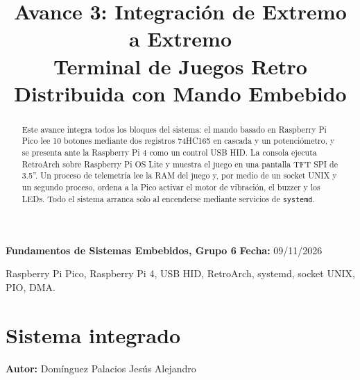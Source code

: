 \documentclass[conference]{IEEEtran}
\begin{document}
\title{Avance 3: Integración de Extremo a Extremo \\
	\large Terminal de Juegos Retro Distribuida con Mando Embebido}

\author{
	\and
	\and
	\and
	\and
	\and
}

\maketitle

\begin{center}
	\vspace{-0.3cm}
	{\small \textbf{Fundamentos de Sistemas Embebidos, Grupo 6} \quad
		\textbf{Fecha:} 09/11/2026}
\end{center}

\begin{abstract}
Este avance integra todos los bloques del sistema: el mando basado en Raspberry Pi Pico lee 10 botones
mediante dos registros 74HC165 en cascada y un potenciómetro, y se presenta ante la Raspberry Pi 4 como un
control USB HID. La consola ejecuta RetroArch sobre Raspberry Pi OS Lite y muestra el juego en una pantalla
TFT SPI de 3.5''. Un proceso de telemetría lee la RAM del juego y, por medio de un socket UNIX y un segundo
proceso, ordena a la Pico activar el motor de vibración, el buzzer y los LEDs. Todo el sistema arranca solo
al encenderse mediante servicios de \texttt{systemd}.
\end{abstract}

\begin{IEEEkeywords}
Raspberry Pi Pico, Raspberry Pi 4, USB HID, RetroArch, systemd, socket UNIX, PIO, DMA.
\end{IEEEkeywords}

\section{Sistema integrado}
\textbf{Autor:} Domínguez Palacios Jesús Alejandro
\end{document}

